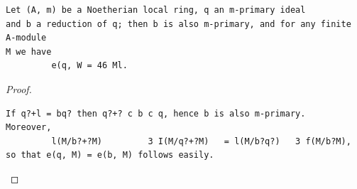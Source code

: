 \begin{theorem}\label{mcrt-auto-theorem-14-13}\uses{}
\begin{verbatim}
Let (A, m) be a Noetherian local ring, q an m-primary ideal
and b a reduction of q; then b is also m-primary, and for any finite A-module
M we have
         e(q, W = 46 Ml.
\end{verbatim}
\end{theorem}
\begin{proof}
\begin{verbatim}
If q?+l = bq? then q?+? c b c q, hence b is also m-primary.
Moreover,
         l(M/b?+?M)         3 I(M/q?+?M)   = l(M/b?q?)   3 f(M/b?M),
so that e(q, M) = e(b, M) follows easily.
\end{verbatim}
\end{proof}


